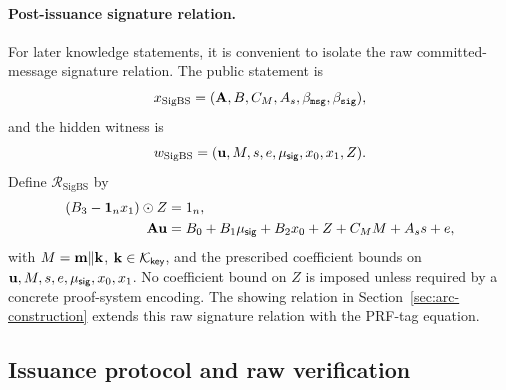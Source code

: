 \paragraph{Post-issuance signature relation.}
For later knowledge statements, it is convenient to isolate the raw committed-message signature relation.  The
public statement is
\[
  x_{\mathrm{SigBS}}=(\mathbf{A},B,C_M,A_s,\beta_{\mathtt{msg}},\beta_{\mathtt{sig}}),
\]
and the hidden witness is
\[
  w_{\mathrm{SigBS}}=(\mathbf{u},M,s,e,\mu_{\mathsf{sig}},x_0,x_1,Z).
\]
Define \(\mathcal R_{\mathrm{SigBS}}\) by
\begin{align}
  (B_3-\mathbf 1_nx_1)\odot Z&=1_n, \label{eq:sigbs-rel-inv}\\
  \mathbf{A}\mathbf{u}&=B_0+B_1\mu_{\mathsf{sig}}+B_2x_0+Z+C_MM+A_s s+e, \label{eq:sigbs-rel-sig}
\end{align}
with \(M=\mathbf{m}\Vert\mathbf{k}\), \(\mathbf{k}\in\mathcal K_{\mathsf{key}}\), and the prescribed coefficient bounds on
\(\mathbf{u},M,s,e,\mu_{\mathsf{sig}},x_0,x_1\).  No coefficient bound on \(Z\) is imposed unless required by a concrete proof-system
encoding.  The showing relation in Section~\ref{sec:arc-construction} extends this raw signature relation with the
PRF-tag equation.

\subsection{Issuance protocol and raw verification}
\label{subsec:bs-protocol}

